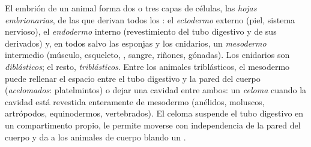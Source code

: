 \begin{definition}\label{def:b1:body-plans-tissues:layers}
El embrión de un animal forma dos o tres capas de células, las \emph{hojas
embrionarias}, de las que derivan todos los :
el \emph{ectodermo} externo (piel, sistema nervioso), el
\emph{endodermo} interno (revestimiento del tubo digestivo
y de sus derivados) y, en todos salvo las esponjas y los cnidarios, un
\emph{mesodermo} intermedio (músculo, esqueleto, , sangre, riñones, gónadas). Los cnidarios son
\emph{diblásticos}; el resto, \emph{triblásticos}. Entre los animales
triblásticos, el mesodermo puede rellenar el espacio entre el tubo digestivo
y la pared del cuerpo (\emph{acelomados}: platelmintos) o dejar una cavidad
entre ambos: un \emph{celoma} cuando la cavidad está revestida
enteramente de mesodermo (anélidos, moluscos, artrópodos, equinodermos,
vertebrados). El celoma suspende el tubo digestivo en un compartimento
propio, le permite moverse con independencia de la pared del cuerpo y da a
los animales de cuerpo blando un .
\end{definition}

